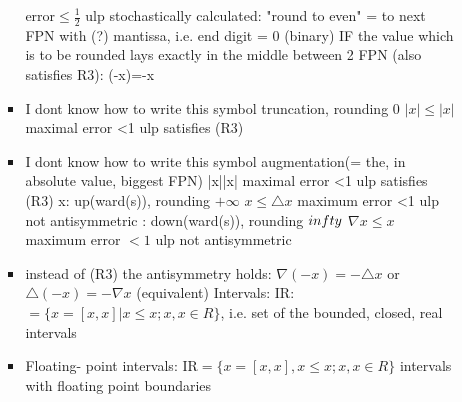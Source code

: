 \begin{itemize}
\begin{itemize}
\begin{itemize}
        \newline \implies error$\leqslant \frac{1}{2}$ ulp
        \newline stochastically calculated: "round to even" = to next FPN with (?) mantissa, i.e. end digit = 0 (binary)
        \newline IF the value which is to be rounded lays exactly in the middle between 2 FPN (also satisfies R3): \square (-x)=-\square x
        \item I dont know how to write this symbol
        \newline truncation, rounding \to $0$
        \newline $|x|\leqslant |x|$
        \newline maximal error <1 ulp
        \newline satisfies (R3)
        \item I dont know how to write this symbol
        \newline augmentation(= the, in absolute value, biggest FPN)
        \newline |x|\leqslant |x|
        \newline maximal error <1 ulp
        \newline satisfies (R3)
        \newline \triangle x: up(ward(s)), rounding \to $+\infty$
        \newline $x\leqslant\triangle x$
        \newline maximum error <1 ulp
        \newline not antisymmetric
        \newline \nablax: down(ward(s)), rounding \to $\-infty$
        \newline $\nabla x\leqslant x$
        \newline maximum error $< 1$ ulp
        \newline not antisymmetric
        \item instead of (R3) the antisymmetry holds: 
        \newline $\nabla (-x)=-\triangle x$
        \newline or $\triangle(-x)=-\nabla x$ (equivalent)
        \newline Intervals:
        \newline IR:$=\{x=[x,x]|x\leqslant x; x,x \in R\}$, i.e. set of the bounded, closed, real intervals
        \item Floating- point intervals:
        \newline IR$=\{x=[x,x], x\leqslant x; x,x\in R\}$ \to intervals with floating point boundaries

\end{itemize}
\end{itemize}
\end{itemize}
